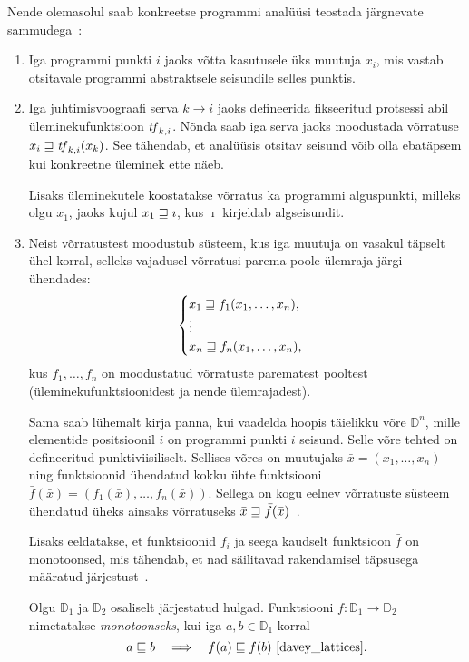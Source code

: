 \documentclass[../thesis.tex]{subfiles}
\begin{document}
Nende olemasolul saab konkreetse programmi analüüsi teostada järgnevate sammudega~\cite{seidl_foundations}:
\begin{enumerate}
	\item Iga programmi punkti $i$ jaoks võtta kasutusele üks muutuja $x_i$, mis vastab otsitavale programmi abstraktsele seisundile selles punktis.

	\item Iga juhtimisvoograafi serva $k \rightarrow i$ jaoks defineerida fikseeritud protsessi abil üleminekufunktsioon $\mathit{tf}_{k,i}$. Nõnda saab iga serva jaoks moodustada võrratuse $x_i \sqsupseteq \mathit{tf}_{k,i}(x_k)$. See tähendab, et analüüsis otsitav seisund võib olla ebatäpsem kui konkreetne üleminek ette näeb.

	Lisaks üleminekutele koostatakse võrratus ka programmi alguspunkti, milleks olgu $x_1$, jaoks kujul $x_1 \sqsupseteq \imath$, kus $\imath$ kirjeldab algseisundit.

	\item Neist võrratustest moodustub süsteem, kus iga muutuja on vasakul täpselt ühel korral, selleks vajadusel võrratusi parema poole ülemraja järgi ühendades:
	\[
		\begin{cases}
			x_1 \sqsupseteq f_1(x_1, \ldots, x_n), \\
			\vdots \\
			x_n \sqsupseteq f_n(x_1, \ldots, x_n),
		\end{cases}
	\]
	kus $f_1, \ldots, f_n$ on moodustatud võrratuste parematest pooltest (üleminekufunktsioonidest ja nende ülemrajadest).

	Sama saab lühemalt kirja panna, kui vaadelda hoopis täielikku võre $\mathbb{D}^n$, mille elementide positsioonil $i$ on programmi punkti $i$ seisund. Selle võre tehted on defineeritud punktiviisiliselt.
	Sellises võres on muutujaks $\bar{x} = (x_1, \ldots, x_n)$ ning funktsioonid ühendatud kokku ühte funktsiooni $\bar{f}(\bar{x}) = (f_1(\bar{x}), \ldots, f_n(\bar{x}))$. Sellega on kogu eelnev võrratuste süsteem ühendatud üheks ainsaks võrratuseks $\bar{x} \sqsupseteq \bar{f}(\bar{x})$~\cite[21]{seidl_foundations}.

	Lisaks eeldatakse, et funktsioonid $f_i$ ja seega kaudselt funktsioon $\bar{f}$ on monotoonsed, mis tähendab, et nad säilitavad rakendamisel täpsusega määratud järjestust~\cite[20]{seidl_foundations}.

	\begin{definition}
	Olgu $\mathbb{D}_1$ ja $\mathbb{D}_2$ osaliselt järjestatud hulgad. Funktsiooni $f: \mathbb{D}_1 \to \mathbb{D}_2$ nimetatakse \emph{monotoonseks}, kui iga $a, b \in \mathbb{D}_1$ korral
	\[
		a \sqleq b \quad\Longrightarrow\quad f(a) \sqleq f(b)~\text{\cite[23]{davey_lattices}}.
	\]
	\end{definition}


\end{enumerate}
\end{document}

